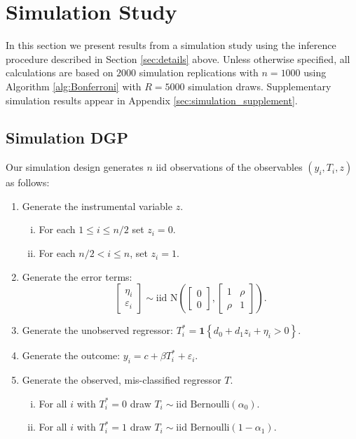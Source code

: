 \section{Simulation Study}

In this section we present results from a simulation study using the inference procedure described in Section \ref{sec:details} above.
Unless otherwise specified, all calculations are based on $2000$ simulation replications with $n = 1000$ using Algorithm \ref{alg:Bonferroni} with $R = 5000$ simulation draws.
Supplementary simulation results appear in Appendix \ref{sec:simulation_supplement}.

\subsection{Simulation DGP}
\label{sec:DGP}
Our simulation design generates $n$ iid observations of the observables $(y_i, T_i, z)$ as follows:
\begin{enumerate}
  \item Generate the instrumental variable $z$.
    \begin{enumerate}[(i)]
      \item For each $1 \leq i \leq n/2$ set $z_i = 0$.
      \item For each $n/2 < i \leq n$, set $z_i = 1$.
    \end{enumerate}
  \item Generate the error terms: 
    \[
      \left[
      \begin{array}{c}
        \eta_i \\ \varepsilon_i
      \end{array}
    \right] \sim \mbox{iid N}\left( \left[
\begin{array}{c}
  0 \\ 0
\end{array}
\right], \left[
\begin{array}{cc}
  1 & \rho \\
  \rho & 1
\end{array}
\right]\right).
\]
  \item Generate the unobserved regressor: $T^*_i = \mathbf{1}\left\{ d_0 + d_1 z_i + \eta_i > 0 \right\}$.
  \item Generate the outcome: $y_i = c + \beta T_i^* + \varepsilon_i$.  
  \item Generate the observed, mis-classified regressor $T$.
    \begin{enumerate}[(i)]
      \item For all $i$ with $T^*_i = 0$ draw $T_i \sim \mbox{iid Bernoulli}(\alpha_0)$. 
      \item For all $i$ with $T^*_i = 1$ draw $T_i \sim \mbox{iid Bernoulli}(1 - \alpha_1)$.
    \end{enumerate}
\end{enumerate}
